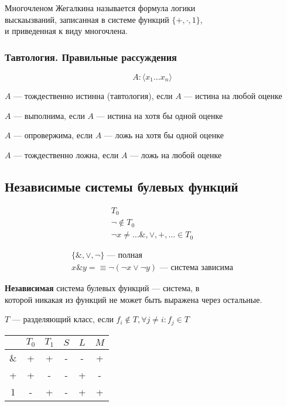 \documentclass{article}
\begin{document}
Многочленом Жегалкина называется формула логики  \\
выскаызваний, записанная в системе функций $\{ +, \cdot, 1 \}$, \\
и приведенная к виду многочлена.

\subsubsection{Тавтология. Правильные рассуждения}

\[ A: \langle x_1 \dots x_n \rangle \]

$A$ --- тождественно истинна (тавтология), если $A$ --- истина на любой оценке

$A$ --- выполнима, если $A$ --- истина на хотя бы одной оценке

$A$ --- опровержима, если $A$ --- ложь на хотя бы одной оценке

$A$ --- тождественно ложна, если $A$ --- ложь на любой оценке

\subsection{Независимые системы булевых функций}

\begin{gather*}
	T_0 \\
	\lnot \not \in T_0 \\
	\lnot x \ne \dots \&, \lor, +, \dots \in T_0
\end{gather*}

\begin{gather*}
	\{ \&, \lor, \lnot \} \text{ --- полная} \\
	x \& y = \equiv \lnot(\lnot x \lor \lnot y) \text{ --- система зависима}
\end{gather*}

\textbf{Независимая} система булевых функций --- система, в \\
которой никакая из функций не может быть выражена через остальные.

$T$ --- разделяющий класс, если $f_i \not \in T, \forall j \ne i : f_j \in T$

\begin{tabular}{c|c|c|c|c|c}
	& $T_0$ & $T_1$ & $S$ & $L$ & $M$ \\
	\hline 
	\& & + & + & - & - & + \\
	+ & + & - & - & + & - \\
	1 & - & + & - & + & + \\
\end{tabular}
\end{document}
